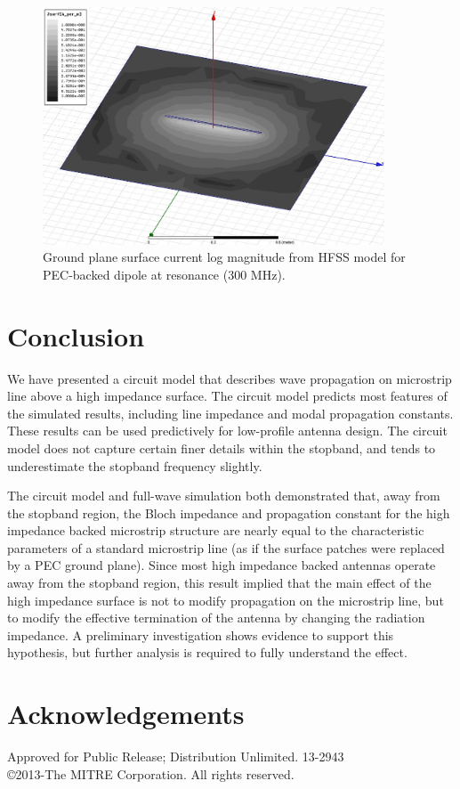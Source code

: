 \documentclass{allertonproc}
\begin{document}
\begin{figure}
\begin{center}
\includegraphics[width=4in]{PECJsurf}
\caption{Ground plane surface current log magnitude from HFSS model for PEC-backed dipole at resonance (300 MHz).}
\label{PECJsurf}
\end{center}
\end{figure}
\FloatBarrier
\section{Conclusion}
We have presented a circuit model that describes wave propagation on microstrip line above a high impedance surface. The circuit model predicts most features of the simulated results, including line impedance and modal propagation constants.  These results can be used predictively for low-profile antenna design. The circuit model does not capture certain finer details within the stopband, and tends to underestimate the stopband frequency slightly.  

The circuit model and full-wave simulation both demonstrated that, away from the stopband region, the Bloch impedance and propagation constant for the high impedance backed microstrip structure are nearly equal to the characteristic parameters of a standard microstrip line (as if the surface patches were replaced by a PEC ground plane).  Since most high impedance backed antennas operate away from the stopband region, this result implied that the main effect of the high impedance surface is not to modify propagation on the microstrip line, but to modify the effective termination of the antenna by changing the radiation impedance.   A preliminary investigation shows evidence to support this hypothesis, but further analysis is required to fully understand the effect.
\section{Acknowledgements}
Approved for Public Release; Distribution Unlimited. 13-2943\\ \copyright 2013-The MITRE Corporation. All rights reserved.

{}
\end{document}
